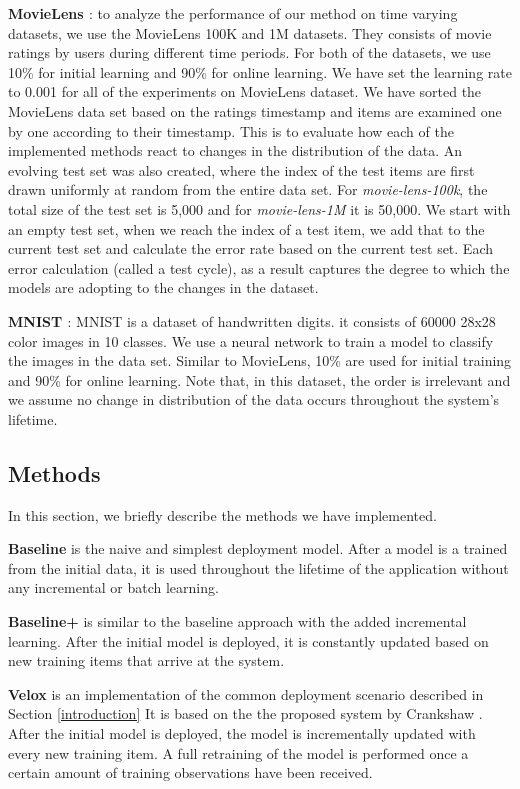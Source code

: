 \documentclass{vldb}
\begin{document}
\textbf{MovieLens \cite{harper2016movielens}}: to analyze the performance of our method on time varying datasets, we use the MovieLens 100K and 1M datasets. 
They consists of movie ratings by users during different time periods. 
For both of the datasets, we use 10\% for initial learning and 90\% for online learning. 
We have set the learning rate to 0.001 for all of the experiments on MovieLens dataset.
We have sorted the MovieLens data set based on the ratings timestamp and items are examined one by one according to their timestamp.
This is to evaluate how each of the implemented methods react to changes in the distribution of the data.
An evolving test set was also created, where the index of the test items are first drawn uniformly at random from the entire data set.
For \textit{movie-lens-100k}, the total size of the test set is 5,000 and for \textit{movie-lens-1M} it is 50,000.
We start with an empty test set, when we reach the index of a test item, we add that to the current test set and calculate the error rate based on the current test set.
Each error calculation (called a test cycle), as a result captures the degree to which the models are adopting to the changes in the dataset.

\textbf{MNIST \cite{lecun-mnist}}: MNIST is a dataset of handwritten digits.
it consists of 60000 28x28 color images in 10 classes. We use a neural network to train a model to classify the images in the data set. 
Similar to MovieLens, 10\% are used for initial training and 90\% for online learning. 
Note that, in this dataset, the order is irrelevant and we assume no change in distribution of the data occurs throughout the system's lifetime. 

\subsection{Methods}
In this section, we briefly describe the methods we have implemented.

\textbf{Baseline} is the naive and simplest deployment model. 
After a model is a trained from the initial data, it is used throughout the lifetime of the application without any incremental or batch learning.

\textbf{Baseline+} is similar to the baseline approach with the added incremental learning.
After the initial model is deployed, it is constantly updated based on new training items that arrive at the system.

\textbf{Velox} is an implementation of the common deployment scenario described in Section \ref{introduction}
It is based on the the proposed system by Crankshaw \cite{crankshaw2014missing}. 
After the initial model is deployed, the model is incrementally updated with every new training item.
A full retraining of the model is performed once a certain amount of training observations have been received.
\end{document}
